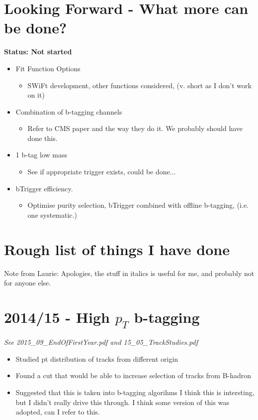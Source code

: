 \section{Looking Forward - What more can be done?}

\textbf{Status: Not started}

\begin{itemize}
  \item{Fit Function Options}
    \begin{itemize}[label={$-$}]
    \item{SWiFt development, other functions considered, (v. short as I don't work on it)}
    \end{itemize}
  \item{Combination of b-tagging channels}
    \begin{itemize}[label={$-$}]
    \item{Refer to CMS paper and the way they do it. We probably should have done this.}
    \end{itemize}
  \item{1 b-tag low mass}
    \begin{itemize}[label={$-$}]
    \item{See if appropriate trigger exists, could be done...}
    \end{itemize}
  \item{bTrigger efficiency.}
    \begin{itemize}[label={$-$}]
    \item{Optimise purity selection, bTrigger combined with offline b-tagging, (i.e. one systematic.) }
    \end{itemize}
  \end{itemize}
  
\newpage

\section{Rough list of things I have done}

Note from Laurie: Apologies, the stuff in italics is useful for me, and probably not for anyone else.

\section{2014/15 - High $p_{T}$ b-tagging}
\textit{See 2015\_09\_EndOfFirstYear.pdf and 15\_05\_TrackStudies.pdf  }
\begin{itemize}
\item{Studied pt distribution of tracks from different origin}
\item{Found a cut that would be able to increase selection of tracks from B-hadron}
\item{Suggested that this is taken into b-tagging algorihms}
  I think this is intersting, but I didn't really drive this through.
  I think some version of this was adopted, can  I refer to this.  
\end{itemize}

